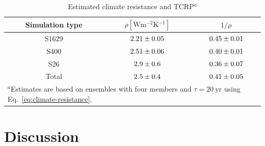\documentclass[draft]{agujournal2019}
\begin{document}
  \begin{table}
    \centering

    \caption{Estimated climate resistance and TCRP\(^{a}\)}\label{tab:trcp}%
    \begin{tabular}{ccc}
      \toprule
      Simulation type & \(\rho [\si{\watt\metre^{-2}\kelvin^{-1}}]\) & \(1/\rho\) \\
      \midrule
      S1629 & \(\num{2.21\pm0.05}\) & \(\num{0.45\pm0.01}\) \\
      S400 & \(\num{2.51\pm0.06}\) & \(\num{0.40\pm0.01}\) \\
      S26 & \(\num{2.9\pm0.6}\) & \(\num{0.36\pm0.07}\) \\
      Total & \(\num{2.5\pm0.4}\) & \(\num{0.41\pm0.05}\) \\
      \toprule
      \multicolumn{3}{l}{\parbox{0.5\linewidth}{\(^{a}\)Estimates are based on ensembles with four members and \(\tau
          =\SI{20}{\mathrm{yr}}\) using Eq.~\ref{eq:climate-resistance}.}} \\
    \end{tabular}
  \end{table}

  \section{Discussion}

  \label{sec:discussion}

\end{document}
